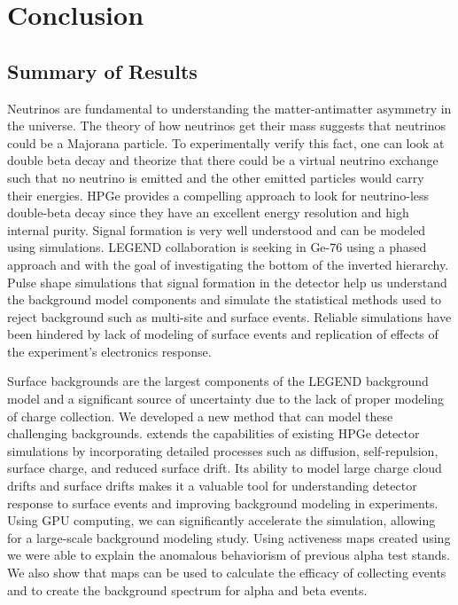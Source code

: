 \chapter{Conclusion}
\label{chap:conclusion}
\section{Summary of Results}
Neutrinos are fundamental to understanding the matter-antimatter asymmetry in the universe. The theory of how neutrinos get their mass suggests that neutrinos could be a Majorana particle. To experimentally verify this fact, one can look at double beta decay and theorize that there could be a virtual neutrino exchange such that no neutrino is emitted and the other emitted particles would carry their energies. HPGe provides a compelling approach to look for neutrino-less double-beta decay since they have an excellent energy resolution and high internal purity. Signal formation is very well understood and can be modeled using simulations. LEGEND collaboration is seeking {\onbb} in Ge-76 using a phased approach and with the goal of investigating the bottom of the inverted hierarchy. Pulse shape simulations that signal formation in the detector help us understand the background model components and simulate the statistical methods used to reject background such as multi-site and surface events. Reliable simulations have been hindered by lack of modeling of surface events and replication of effects of the experiment's electronics response.

Surface backgrounds are the largest components of the LEGEND background model and a significant source of uncertainty due to the lack of proper modeling of charge collection. We developed a new method that can model these challenging backgrounds. {\ehd} extends the capabilities of existing HPGe detector simulations by incorporating detailed processes such as diffusion, self-repulsion, surface charge, and reduced surface drift. Its ability to model large charge cloud drifts and surface drifts makes it a valuable tool for understanding detector response to surface events and improving background modeling in experiments. Using GPU computing, we can significantly accelerate the simulation, allowing for a large-scale background modeling study. Using activeness maps created using {\ehd} we were able to explain the anomalous behaviorism of previous alpha test stands. We also show that maps can be used to calculate the efficacy of collecting {\onbb} events and to create the background spectrum for alpha and beta events.

